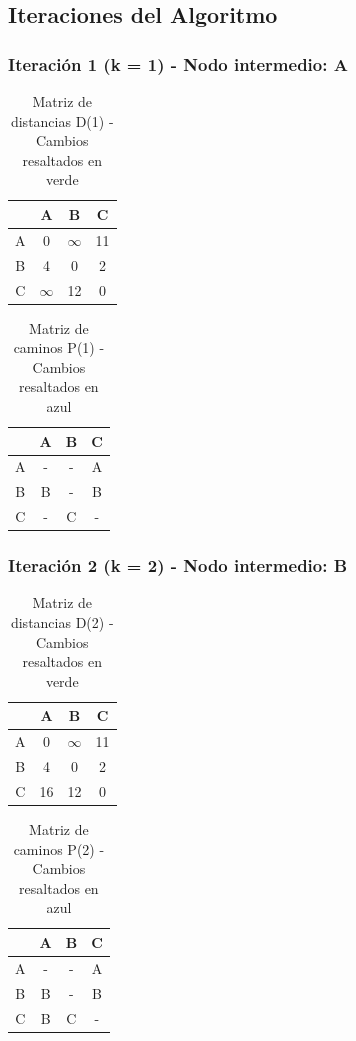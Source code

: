 \documentclass[12pt]{article}
\begin{document}
\clearpage
\subsection{Iteraciones del Algoritmo}
\subsubsection{Iteración 1 (k = 1) - Nodo intermedio: A}
\begin{table}[h!]
\centering
\begin{tabular}{|c|c|c|c|}
\hline
 & A & B & C \\\hline
A & 0 & $\infty$ & 11 \\\hline
B & 4 & 0 & 2 \\\hline
C & $\infty$ & 12 & 0 \\\hline
\end{tabular}
\caption{Matriz de distancias D(1) - Cambios resaltados en verde}
\end{table}

\begin{table}[h!]
\centering
\begin{tabular}{|c|c|c|c|}
\hline
 & A & B & C \\\hline
A & - & - & A \\\hline
B & B & - & B \\\hline
C & - & C & - \\\hline
\end{tabular}
\caption{Matriz de caminos P(1) - Cambios resaltados en azul}
\end{table}

\subsubsection{Iteración 2 (k = 2) - Nodo intermedio: B}
\begin{table}[h!]
\centering
\begin{tabular}{|c|c|c|c|}
\hline
 & A & B & C \\\hline
A & 0 & $\infty$ & 11 \\\hline
B & 4 & 0 & 2 \\\hline
C & \cellcolor{lightgreen} 16 & 12 & 0 \\\hline
\end{tabular}
\caption{Matriz de distancias D(2) - Cambios resaltados en verde}
\end{table}

\begin{table}[h!]
\centering
\begin{tabular}{|c|c|c|c|}
\hline
 & A & B & C \\\hline
A & - & - & A \\\hline
B & B & - & B \\\hline
C & \cellcolor{lightblue} B & C & - \\\hline
\end{tabular}
\caption{Matriz de caminos P(2) - Cambios resaltados en azul}
\end{table}
\end{document}

